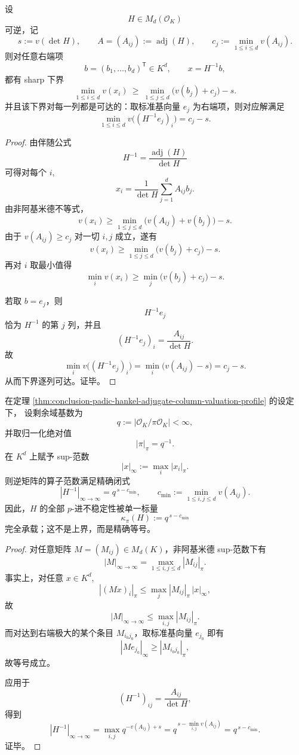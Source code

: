 \begin{theorem}[伴随矩阵的列估值轮廓与可达最优解]\label{thm:conclusion-padic-hankel-adjugate-column-valuation-profile}
设
\[
H\in M_d(\mathcal O_K)
\]
可逆，记
\[
s:=v(\det H),\qquad
A=(A_{ij}):=\operatorname{adj}(H),
\qquad
c_j:=\min_{1\le i\le d}v(A_{ij}).
\]
则对任意右端项
\[
b=(b_1,\dots,b_d)^{\mathsf T}\in K^d,
\qquad
x=H^{-1}b,
\]
都有 sharp 下界
\[
\min_{1\le i\le d}v(x_i)\ \ge\ \min_{1\le j\le d}\bigl(v(b_j)+c_j\bigr)-s.
\]
并且该下界对每一列都是可达的：取标准基向量 \(e_j\) 为右端项，则对应解满足
\[
\min_{1\le i\le d}v\bigl((H^{-1}e_j)_i\bigr)=c_j-s.
\]
\end{theorem}
\begin{proof}
由伴随公式
\[
H^{-1}=\frac{\operatorname{adj}(H)}{\det H}
\]
可得对每个 \(i\),
\[
x_i=\frac{1}{\det H}\sum_{j=1}^{d}A_{ij}b_j.
\]
由非阿基米德不等式，
\[
v(x_i)\ge \min_{1\le j\le d}\bigl(v(A_{ij})+v(b_j)\bigr)-s.
\]
由于 \(v(A_{ij})\ge c_j\) 对一切 \(i,j\) 成立，遂有
\[
v(x_i)\ge \min_{1\le j\le d}\bigl(v(b_j)+c_j\bigr)-s.
\]
再对 \(i\) 取最小值得
\[
\min_i v(x_i)\ge \min_j\bigl(v(b_j)+c_j\bigr)-s.
\]

若取 \(b=e_j\)，则
\[
H^{-1}e_j
\]
恰为 \(H^{-1}\) 的第 \(j\) 列，并且
\[
(H^{-1}e_j)_i=\frac{A_{ij}}{\det H}.
\]
故
\[
\min_i v\bigl((H^{-1}e_j)_i\bigr)
=
\min_i\bigl(v(A_{ij})-s\bigr)
=
c_j-s.
\]
从而下界逐列可达。证毕。
\end{proof}

\begin{theorem}[非阿基米德条件数的精确账本公式]\label{thm:conclusion-padic-hankel-exact-condition-ledger}
在定理 \ref{thm:conclusion-padic-hankel-adjugate-column-valuation-profile} 的设定下，
设剩余域基数为
\[
q:=\bigl|\mathcal O_K/\pi\mathcal O_K\bigr|<\infty,
\]
并取归一化绝对值
\[
|\pi|_\pi=q^{-1}.
\]
在 \(K^d\) 上赋予 sup-范数
\[
|x|_\infty:=\max_i |x_i|_\pi.
\]
则逆矩阵的算子范数满足精确闭式
\[
|H^{-1}|_{\infty\to\infty}
=
q^{\,s-c_{\min}},
\qquad
c_{\min}:=\min_{1\le i,j\le d}v(A_{ij}).
\]
因此，\(H\) 的全部 \(p\)-进不稳定性被单一标量
\[
\kappa_\pi(H):=q^{\,s-c_{\min}}
\]
完全承载；这不是上界，而是精确等号。
\end{theorem}
\begin{proof}
对任意矩阵 \(M=(M_{ij})\in M_d(K)\)，非阿基米德 sup-范数下有
\[
|M|_{\infty\to\infty}=\max_{1\le i,j\le d}|M_{ij}|_\pi.
\]
事实上，对任意 \(x\in K^d\),
\[
|(Mx)_i|_\pi
\le
\max_j |M_{ij}|_\pi\,|x|_\infty,
\]
故
\[
|M|_{\infty\to\infty}\le \max_{i,j}|M_{ij}|_\pi.
\]
而对达到右端极大的某个条目 \(M_{i_0j_0}\)，取标准基向量 \(e_{j_0}\) 即有
\[
|Me_{j_0}|_\infty\ge |M_{i_0j_0}|_\pi,
\]
故等号成立。

应用于
\[
(H^{-1})_{ij}=\frac{A_{ij}}{\det H},
\]
得到
\[
|H^{-1}|_{\infty\to\infty}
=
\max_{i,j} q^{-v(A_{ij})+s}
=
q^{\,s-\min_{i,j}v(A_{ij})}
=
q^{\,s-c_{\min}}.
\]
证毕。
\end{proof}

